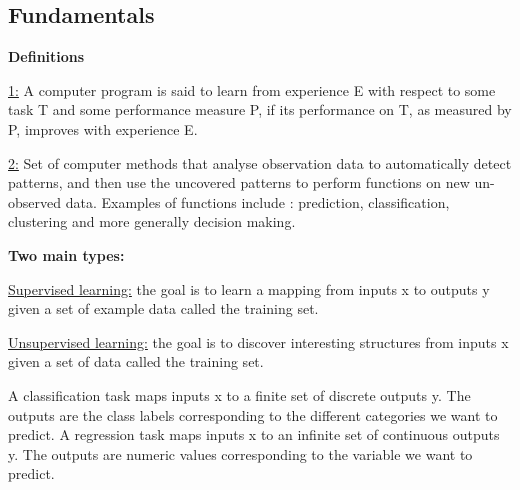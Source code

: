 \subsection*{Fundamentals}
\textbf{Definitions}

\underline{1:} A computer program is said to
learn from experience E with respect to some task T
and some performance measure P, if its performance
on T, as measured by P, improves with experience E.

\underline{2:} Set of computer methods that
analyse observation data to automatically detect
patterns, and then use the uncovered patterns to
perform functions on new un-observed data. Examples
of functions include : prediction, classification,
clustering and more generally decision making.

\textbf{Two main types:}

\underline{Supervised learning:} the goal is to learn a
mapping from inputs x to outputs y given a set of
example data called the training set.

\underline{Unsupervised learning:} the goal is to discover
interesting structures from inputs x given a set of data
called the training set.

A classification task maps inputs x to a finite set of
discrete outputs y. The outputs are the class labels
corresponding to the different categories we want to
predict. A regression task maps inputs x to an infinite set of
continuous outputs y. The outputs are numeric values
corresponding to the variable we want to predict.
